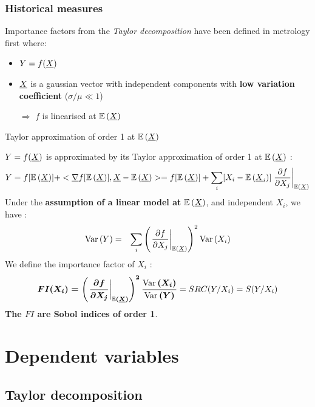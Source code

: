 \documentclass[8pt]{beamer}
\begin{document}
\begin{frame}
\frametitle{Historical measures}

\small
  Importance factors from the \emph{Taylor decomposition} have been defined in metrology first where:
  \begin{itemize}
  \item $Y=f({\underline{X}})$
   \item ${\underline{X}}$ is a gaussian vector with independent components with {\bf low variation coefficient} ($\sigma / \mu \ll 1$)
   \item[$\Longrightarrow$] $f$ is linearised at $\mathbb{E}\left( {\underline{X}} \right)$
  \end{itemize}


  \begin{block}{Taylor approximation of order 1 at $\mathbb{E}\left( {\underline{X}} \right)$}

$Y=f({\underline{X}})$ is approximated by its  \alert{ Taylor approximation of order 1 at $\mathbb{E}\left( {\underline{X}} \right)$ } :
\begin{equation}
Y = f[\mathbb{E}\left( {\underline{X}} \right)] + <{\underline{\nabla }}f[\mathbb{E}\left( {\underline{X}} \right)], {\underline{X}} - \mathbb{E}\left( {\underline{X}} \right)> =  f[\mathbb{E}\left( {\underline{X}} \right)] + \sum_i [X_i-\mathbb{E}\left( {\underline{X}}_i \right)]\left.\frac{\partial f}{\partial X_j}\right|_{\mathbb{E}\left( {\underline{X}} \right)}
\end{equation}
Under the  {\bf assumption of a linear model at} $\mathbb{E}\left( {\underline{X}} \right)$, and  \alert{independent $X_i$}, we have :
\begin{eqnarray}
\mbox{Var}\left( Y \right) & = & \sum_i \left(\left.\frac{\partial f}{\partial X_j}\right|_{\mathbb{E}\left( {\underline{X}} \right)}\right)^2 \mbox{Var}\left( X_i \right)
\end{eqnarray}
We define the  \alert{importance factor of $X_i$} :
$$
\boldsymbol{
FI(X_i) = \left(\left.\frac{\partial f}{\partial X_j}\right|_{\mathbb{E}\left( {\underline{X}} \right)}\right)^2 \frac{\mbox{Var}\left( X_i \right)}{\mbox{Var}\left( Y \right)}
} = SRC(Y / X_i) = S(Y/X_i)
$$
{\bf The $FI$ are Sobol indices of order 1}.
  
\end{block}

  \end{frame}





\section{Dependent variables}

\subsection{Taylor decomposition}
\end{document}
